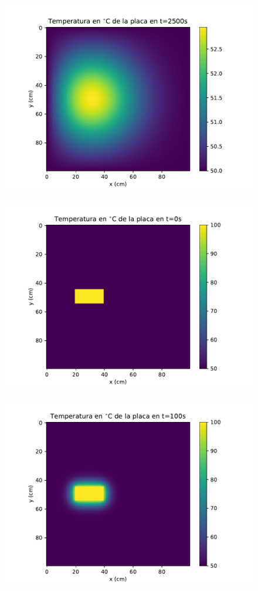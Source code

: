 \documentclass[12pt,letterpaper]{article}
\begin{document}
\begin{figure}[h]
\includegraphics{f1_2500.pdf}
\centering
\end{figure}

\begin{figure}[h]
\includegraphics{f2_0.pdf}
\centering
\end{figure}

\begin{figure}[h]
\includegraphics{f2_100.pdf}
\centering
\end{figure}
\end{document}
